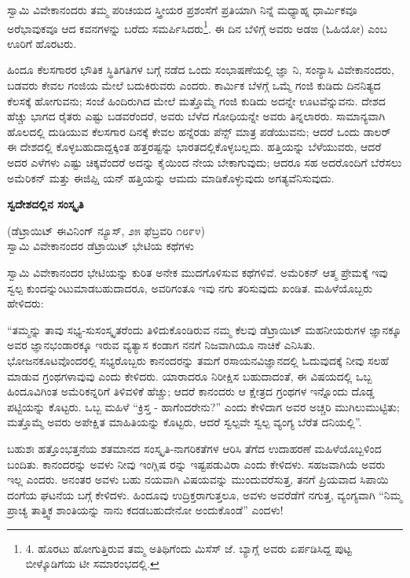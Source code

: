 ಸ್ವಾಮಿ ವಿವೇಕಾನಂದರು ತಮ್ಮ ಪರಿಚಯದ ಸ್ತ್ರೀಯರ ಪ್ರಶಂಸೆಗೆ ಪ್ರತಿಯಾಗಿ ನಿನ್ನೆ ಮಧ್ಯಾಹ್ನ ಧಾರ್ಮಿಕವೂ ಅರೆಭಾವುಕವೂ ಆದ ಕವನಗಳನ್ನು ಬರೆದು ಸಮರ್ಪಿಸಿದರು\footnote{4. ಹೊರಟು ಹೋಗುತ್ತಿರುವ ತಮ್ಮ ಅತಿಥಿಗೆಂದು ಮಿಸೆಸ್ ಜೆ. ಬ್ಯಾಗ್ಲೆ ಅವರು ಏರ್ಪಡಿಸಿದ್ದ ಪುಟ್ಟ ಬೀಳ್ಕೊಡಿಗೆಯ ಟೀ ಸಮಾರಂಭದಲ್ಲಿ.}. ಈ ದಿನ ಬೆಳಿಗ್ಗೆ ಅವರು ಅಡಙ (ಓಹಿಯೋ) ಎಂಬ ಊರಿಗೆ ಹೊರಟರು.

ಹಿಂದೂ ಕೆಲಸಗಾರರ ಭೌತಿಕ ಸ್ಥಿತಿಗತಿಗಳ ಬಗ್ಗೆ ನಡೆದ ಒಂದು ಸಂಭಾಷಣೆಯಲ್ಲಿ ಜ್ಞಾ ನಿ, ಸಂನ್ಯಾಸಿ ವಿವೇಕಾನಂದರು, ಬಡವರು ಕೇವಲ ಗಂಜಿಯ ಮೇಲೆ ಬದುಕಿರುವರು ಎಂದರು. ಕಾರ್ಮಿಕ ಬೆಳಗ್ಗೆ ಒಮ್ಮೆ ಗಂಜಿ ಕುಡಿದು ದಿನನಿತ್ಯದ ಕೆಲಸಕ್ಕೆ ಹೋಗುವನು; ಸಂಜೆ ಹಿಂದಿರುಗಿದ ಮೇಲೆ ಮತ್ತೊಮ್ಮೆ ಗಂಜಿ ಕುಡಿದು ಅದನ್ನೇ ಊಟವೆನ್ನುವನು. ದೇಶದ ಹೆಚ್ಚು ಭಾಗದ ರೈತರು ಎಷ್ಟು ಬಡವರೆಂದರೆ, ಅವರು ಬೆಳೆದ ಗೋಧಿಯನ್ನೇ ಅವರು ತಿನ್ನಲಾರರು. ಸಾಮಾನ್ಯವಾಗಿ ಹೊಲದಲ್ಲಿ ದುಡಿಯುವ ಕೆಲಸಗಾರ ದಿನಕ್ಕೆ ಕೇವಲ ಹನ್ನೆರಡು ಪೆನ್ಸ್ ಮಾತ್ರ ಪಡೆಯುವನು; ಆದರೆ ಒಂದು ಡಾಲರ್ ಈ ದೇಶದಲ್ಲಿ ಕೊಳ್ಳಬಹುದಾದ್ದಕ್ಕಿಂತ ಹತ್ತರಷ್ಟನ್ನು ಭಾರತದಲ್ಲಿಕೊಳ್ಳಬಲ್ಲದು. ಹತ್ತಿಯನ್ನು ಬೆಳೆಯುವರು, ಆದರೆ ಅದರ ಎಳೆಗಳು ಎಷ್ಟು ಚಿಕ್ಕವೆಂದರೆ ಅದನ್ನು ಕೈಯಿಂದ ನೇಯ ಬೇಕಾಗುವುದು; ಆದರೂ ಸಹ ಅದರೊಂದಿಗೆ ಬೆರೆಸಲು ಅಮೆರಿಕನ್ ಮತ್ತು ಈಜಿಪ್ಷಿ ಯನ್ ಹತ್ತಿಯನ್ನು ಆಮದು ಮಾಡಿಕೊಳ್ಳುವುದು ಅಗತ್ಯವೆನಿಸುವುದು.

\begin{center}
\textbf{ಸ್ವದೇಶದಲ್ಲಿನ ಸಂಸ್ಕೃತಿ}
\end{center}

\begin{center}
(ಡೆಟ್ರಾಯಿಟ್ ಈವಿನಿಂಗ್ ನ್ಯೂಸ್, ೨೫ ಫೆಬ್ರವರಿ ೧೮೯೪)\\ಸ್ವಾಮಿ ವಿವೇಕಾನಂದರ ಡೆಟ್ರಾಯಿಟ್ ಭೇಟಿಯ ಕಥೆಗಳು
\end{center}

ಸ್ವಾಮಿ ವಿವೇಕಾನಂದರ ಭೇಟಿಯನ್ನು ಕುರಿತ ಅನೇಕ ಮುದಗೊಳಿಸುವ ಕಥೆಗಳಿವೆ. ಅಮೆರಿಕನ್ ಆತ್ಮ ಪ್ರೇಮಕ್ಕೆ ಇವು ಸ್ವಲ್ಪ ಕುಂದನ್ನುಂಟುಮಾಡಬಹುದಾದರೂ, ಅವರಿಗಂತೂ ಇವು ನಗು ತರಿಸುವುದು ಖಂಡಿತ. ಮಹಿಳೆಯೊಬ್ಬರು ಹೇಳಿದರು:

“ತಮ್ಮನ್ನು ತಾವು ಸಭ್ಯ-ಸುಸಂಸ್ಕೃತರೆಂದು ತಿಳಿದುಕೊಂಡಿರುವ ನಮ್ಮ ಕೆಲವು ಡೆಟ್ರಾಯಿಟ್ ಮಹನೀಯರುಗಳ ಜ್ಞಾನಕ್ಕೂ ಅವರ ಜ್ಞಾನಭಂಡಾರಕ್ಕೂ ಇರುವ ವ್ಯತ್ಯಾಸ ಕಂಡಾಗ ನನಗೆ ನಿಜವಾಗಿಯೂ ನಾಚಿಕೆ ಎನಿಸಿತು. ಭೋಜನಕೂಟವೊಂದರಲ್ಲಿ ಸಭ್ಯರೊಬ್ಬರು ಕಾನಂದರನ್ನು ತಮಗೆ ರಸಾಯನವಿಜ್ಞಾನದಲ್ಲಿ ಓದುವುದಕ್ಕೆ ನೀವು ಸಲಹೆ ಮಾಡುವ ಗ್ರಂಥಗಳಾವುವು ಎಂದು ಕೇಳಿದರು. ಯಾರಾದರೂ ನಿರೀಕ್ಷಿಸ ಬಹುದಾದಂತೆ, ಈ ವಿಷಯದಲ್ಲಿ ಒಬ್ಬ ಹಿಂದೂವಿಗಿಂತ ಅಮೆರಿಕನ್ನರಿಗೆ ತಿಳಿವಳಿಕೆ ಹೆಚ್ಚು; ಆದರೆ ಕಾನಂದರು ಆ ಕ್ಷೇತ್ರದ ಗ್ರಂಥಗಳ ಇನ್ನೊಂದು ದೊಡ್ಡ ಪಟ್ಟಿಯನ್ನು ಕೊಟ್ಟರು. ಒಬ್ಬ ಮಹಿಳೆ “ಕ್ರಿಸ್ತ - ಹಾಗೆಂದರೇನು?” ಎಂದು ಕೇಳಿದಾಗ ಅವರ ಅಚ್ಚರಿ ಮುಗಿಲುಮುಟ್ಟಿತು; ಮತ್ತೊಮ್ಮೆ ಅವರು ಅಪೇಕ್ಷಿತ ಮಾಹಿತಿಯನ್ನು ಕೊಟ್ಟರು, ಆದರೆ ಸ್ವಲ್ಪವೇ ಸ್ವಲ್ಪ ವ್ಯಂಗ್ಯ ಬೆರೆತ ದನಿಯಲ್ಲಿ”.

ಬಹುಶಃ ಹತ್ತೊಂಭತ್ತನೆಯ ಶತಮಾನದ ಸಂಸ್ಕೃತಿ-ನಾಗರಿಕತೆಗಳ ಆರಿಸಿ ತೆಗೆದ ಉದಾಹರಣೆ ಮಹಿಳೆಯೊಬ್ಬಳಿಂದ ಬಂದಿತು. ಕಾನಂದರನ್ನು ಅವಳು ನೀವು ಇಂಗ್ಲಿಷ ರನ್ನು ಇಷ್ಟಪಡುವಿರಾ ಎಂದು ಕೇಳಿದಳು. ಸಹಜವಾಗಿಯೆ ಅವರು ಇಲ್ಲ ಎಂದರು. ಅನಂತರ ಅವಳು ಬಹು ನಯವಾಗಿ ವಿಷಯವನ್ನು ಮುಂದುವರೆಸುತ್ತ, ತನಗೆ ಪ್ರಿಯವಾದ ಸಿಪಾಯಿ ದಂಗೆಯ ಘಟನೆಯ ಬಗ್ಗೆ ಕೇಳಿದಳು. ಹಿಂದೂವು ಉದ್ರಿಕ್ತರಾಗುತ್ತಲೂ, ಅವಳು ಅವರೆಡೆಗೆ ನಗುತ್ತ, ವ್ಯಂಗ್ಯವಾಗಿ “ನಿಮ್ಮ ಪ್ರಾಚ್ಯ ತಾತ್ತ್ವಿಕ ಶಾಂತಿಯನ್ನು ನಾನು ಕದಡಬಹುದೇನೋ ಅಂದುಕೊಂಡೆ” ಎಂದಳು!

